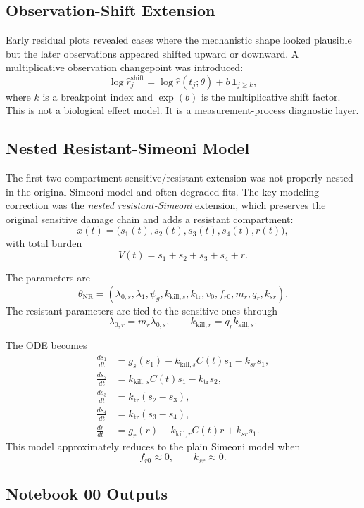 \documentclass[11pt,a4paper]{article}
\begin{document}
\subsection{Observation-Shift Extension}

Early residual plots revealed cases where the mechanistic shape looked plausible but the later observations appeared shifted upward or downward. A multiplicative observation changepoint was introduced:
\[
    \log \widehat r^{\mathrm{shift}}_j
    =
    \log \widehat r(t_j;\theta)+b\,\mathbf{1}_{j\geq k},
\]
where $k$ is a breakpoint index and $\exp(b)$ is the multiplicative shift factor. This is not a biological effect model. It is a measurement-process diagnostic layer.

\subsection{Nested Resistant-Simeoni Model}

The first two-compartment sensitive/resistant extension was not properly nested in the original Simeoni model and often degraded fits. The key modeling correction was the \emph{nested resistant-Simeoni} extension, which preserves the original sensitive damage chain and adds a resistant compartment:
\[
    x(t)=\bigl(s_1(t),s_2(t),s_3(t),s_4(t),r(t)\bigr),
\]
with total burden
\[
    V(t)=s_1+s_2+s_3+s_4+r.
\]

The parameters are
\[
    \theta_{\mathrm{NR}}
    =
    (\lambda_{0,s},\lambda_1,\psi_g,k_{\mathrm{kill},s},k_{\mathrm{tr}},v_0,f_{r0},m_r,q_r,k_{sr}).
\]
The resistant parameters are tied to the sensitive ones through
\[
    \lambda_{0,r}=m_r\lambda_{0,s},
    \qquad
    k_{\mathrm{kill},r}=q_r k_{\mathrm{kill},s}.
\]

The ODE becomes
\[
\begin{aligned}
    \frac{ds_1}{dt}&=g_s(s_1)-k_{\mathrm{kill},s}C(t)s_1-k_{sr}s_1,\\
    \frac{ds_2}{dt}&=k_{\mathrm{kill},s}C(t)s_1-k_{\mathrm{tr}}s_2,\\
    \frac{ds_3}{dt}&=k_{\mathrm{tr}}(s_2-s_3),\\
    \frac{ds_4}{dt}&=k_{\mathrm{tr}}(s_3-s_4),\\
    \frac{dr}{dt}&=g_r(r)-k_{\mathrm{kill},r}C(t)r+k_{sr}s_1.
\end{aligned}
\]
This model approximately reduces to the plain Simeoni model when
\[
    f_{r0}\approx 0,
    \qquad
    k_{sr}\approx 0.
\]

\subsection{Notebook 00 Outputs}
\end{document}
